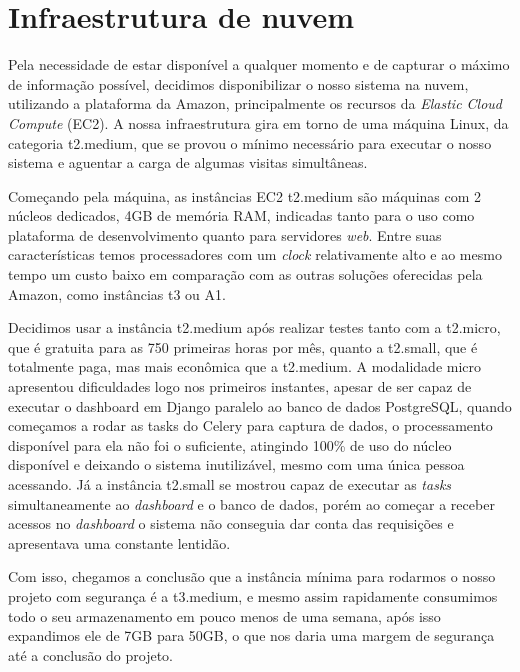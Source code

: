 \section{Infraestrutura de nuvem}
\indent
\par Pela necessidade de estar disponível a qualquer momento e de capturar o máximo de informação possível, decidimos disponibilizar o nosso sistema na nuvem, utilizando a plataforma da Amazon, principalmente os recursos da \textit{Elastic Cloud Compute} (EC2). A nossa infraestrutura gira em torno de uma máquina Linux, da categoria t2.medium, que se provou o mínimo necessário para executar o nosso sistema e aguentar a carga de algumas visitas simultâneas.
\indent
\par Começando pela máquina, as instâncias EC2 t2.medium são máquinas com 2 núcleos dedicados, 4GB de memória RAM, indicadas tanto para o uso como plataforma de desenvolvimento quanto para servidores \textit{web}. Entre suas características temos processadores com um \textit{clock} relativamente alto e ao mesmo tempo um custo baixo em comparação com as outras soluções oferecidas pela Amazon, como instâncias t3 ou A1. 
\indent
\par Decidimos usar a instância t2.medium após realizar testes tanto com a t2.micro, que é gratuita para as 750 primeiras horas por mês, quanto a t2.small, que é totalmente paga, mas mais econômica que a t2.medium. A modalidade micro apresentou dificuldades logo nos primeiros instantes, apesar de ser capaz de executar o dashboard em Django paralelo ao banco de dados PostgreSQL, quando começamos a rodar as tasks do Celery para captura de dados, o processamento disponível para ela não foi o suficiente, atingindo 100\% de uso do núcleo disponível e deixando o sistema inutilizável, mesmo com uma única pessoa acessando. Já a instância t2.small se mostrou capaz de executar as \textit{tasks} simultaneamente ao \textit{dashboard} e o banco de dados, porém ao começar a receber acessos no \textit{dashboard} o sistema não conseguia dar conta das requisições e apresentava uma constante lentidão. 
\indent
\par Com isso, chegamos a conclusão que a instância mínima para rodarmos o nosso projeto com segurança é a t3.medium, e mesmo assim rapidamente consumimos todo o seu armazenamento em pouco menos de uma semana, após isso expandimos ele de 7GB para 50GB, o que nos daria uma margem de segurança até a conclusão do projeto.



